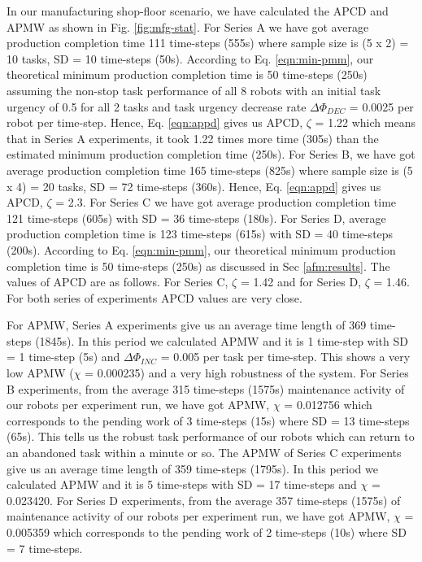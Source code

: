 \documentclass[final,5p,times,twocolumn]{elsarticle}
\begin{document}
In our manufacturing shop-floor scenario, we have calculated the APCD and APMW as shown in Fig. \ref{fig:mfg-stat}. For Series A we have got  average production completion time 111 time-steps (555s) where sample size is (5 x 2) = 10 tasks, SD = 10 time-steps (50s). According to Eq. \ref{eqn:min-pmm}, our theoretical minimum production completion time is 50 time-steps (250s) assuming the non-stop task performance of all 8 robots with an initial task urgency of 0.5 for all 2 tasks and task urgency decrease rate $\Delta \Phi_{DEC }$ = 0.0025 per robot per time-step.  Hence, Eq. \ref{eqn:appd} gives us APCD, $\zeta$ = 1.22 which means that in Series A experiments, it took 1.22 times more time (305s) than the estimated minimum production completion time (250s). For Series B, we have got average production completion time 165 time-steps (825s) where sample size is (5 x 4) = 20 tasks, SD = 72 time-steps (360s).  Hence, Eq. \ref{eqn:appd} gives us APCD, $\zeta$ = 2.3. For Series C we have got average production completion time 121 time-steps (605s) with SD = 36 time-steps (180s). For Series D,  average production completion time is 123 time-steps (615s) with SD = 40 time-steps (200s). According to Eq. \ref{eqn:min-pmm}, our theoretical minimum production completion time is 50 time-steps (250s) as discussed in Sec \ref{afm:results}.  The values of APCD are as follows. For Series C, $\zeta$ = 1.42 and for Series D, $\zeta$ = 1.46. For both series of experiments APCD values are very close.

For APMW, Series A experiments give us an average time length of 369 time-steps (1845s).  In this period we calculated APMW and it is 1 time-step with SD = 1 time-step (5s) and $\Delta \Phi_{INC}$ = 0.005 per task per time-step. This shows a very low APMW ($\chi$ = 0.000235) and a very high robustness of the system. For Series B experiments, from the average 315 time-steps (1575s) maintenance activity of our robots per experiment run, we have got APMW, $\chi$ = 0.012756 which corresponds to the pending work of 3 time-steps (15s) where SD = 13 time-steps (65s). This tells us the robust task performance of our robots which can return to an abandoned task within a minute or so. The APMW of Series C experiments give us an average time length of 359 time-steps (1795s). In this period we calculated APMW and it is 5 time-steps with SD = 17 time-steps and $\chi$ = 0.023420. For Series D experiments, from the average 357 time-steps (1575s) of maintenance activity of our robots per experiment run, we have got APMW, $\chi$ = 0.005359 which corresponds to the pending work of 2 time-steps (10s) where SD = 7 time-steps.
\end{document}

